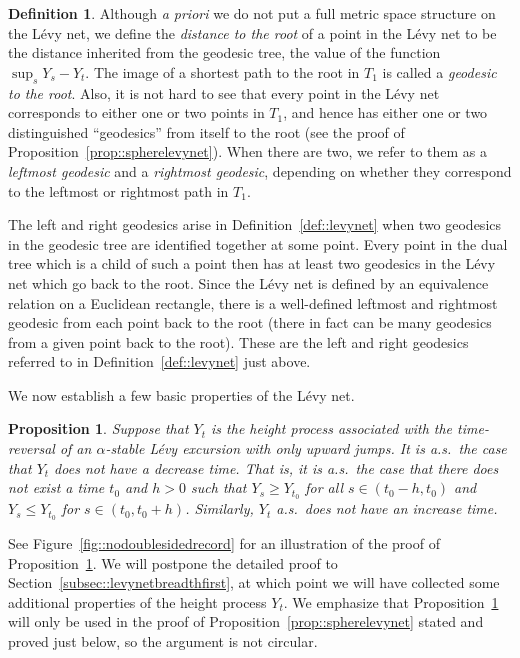 \documentclass[10pt]{amsart}
\theoremstyle{plain}
\numberwithin{theorem}{section}
\newtheorem{proposition}[theorem]{Proposition}
\theoremstyle{definition}
\newtheorem{definition}[theorem]{Definition}
\begin{document}
\begin{definition}
Although \emph{a priori} we do not put a full metric space structure on the Lévy net, we define the \emph{distance to the root} of a point in the Lévy net to be the distance inherited from the geodesic tree, \ie the value of the function $\sup_s Y_s-Y_t$. The image of a shortest path to the root in $T_1$ is called a \emph{geodesic to the root}. Also, it is not hard to see that every point in the Lévy net corresponds to either one or two points in $T_1$, and hence has either one or two distinguished ``geodesics'' from itself to the root (see the proof of Proposition~\ref{prop::spherelevynet}). When there are two, we refer to them as a \emph{leftmost geodesic} and a \emph{rightmost geodesic}, depending on whether they correspond to the leftmost or rightmost path in $T_1$.
\end{definition}

The left and right geodesics arise in Definition~\ref{def::levynet} when two geodesics in the geodesic tree are identified together at some point. Every point in the dual tree which is a child of such a point then has at least two geodesics in the Lévy net which go back to the root. Since the Lévy net is defined by an equivalence relation on a Euclidean rectangle, there is a well-defined leftmost and rightmost geodesic from each point back to the root (there in fact can be many geodesics from a given point back to the root). These are the left and right geodesics referred to in Definition~\ref{def::levynet} just above.

We now establish a few basic properties of the Lévy net.

\begin{proposition}
\label{prop::nodoublesidedrecord}
Suppose that $Y_t$ is the height process associated with the time-reversal of an $\alpha$-stable Lévy excursion with only upward jumps. It is a.s.\ the case that $Y_t$ does not have a decrease time. That is, it is a.s.\ the case that there does not exist a time $t_0$ and $h>0$ such that $Y_s \geq Y_{t_0}$ for all $s \in (t_0-h, t_0)$ and $Y_s \leq Y_{t_0}$ for $s \in (t_0, t_0+h)$. Similarly, $Y_t$ a.s.\ does not have an increase time.
\end{proposition}

See Figure~\ref{fig::nodoublesidedrecord} for an illustration of the proof of Proposition~\ref{prop::nodoublesidedrecord}. We will postpone the detailed proof to Section~\ref{subsec::levynetbreadthfirst}, at which point we will have collected some additional properties of the height process $Y_t$. We emphasize that Proposition~\ref{prop::nodoublesidedrecord} will only be used in the proof of Proposition~\ref{prop::spherelevynet} stated and proved just below, so the argument is not circular.
\end{document}
